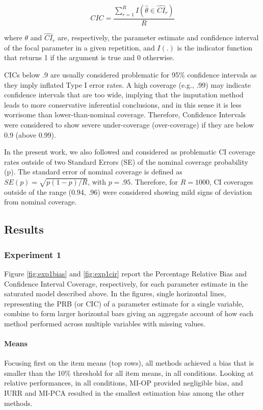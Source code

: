 	\begin{equation} \label{eqn:cic}
		CIC =  \frac{ \sum_{r=1}^{R} I(\hat{\theta} \in \widehat{CI}_r ) }{R}
	\end{equation}

	where $\theta$ and $\widehat{CI}_r$ are, respectively, the parameter estimate and confidence interval of
	the focal parameter in a given repetition, 
	and $I(.)$ is the indicator function that returns 1 if the argument is true and 0 otherwise.

	CICs below .9 are usually considered problematic for 95\% confidence intervals \cite[p. 52]{vanBuuren:2018} 
	as they imply inflated Type I error rates.
	A high coverage (e.g., .99) may indicate confidence intervals that are too wide, implying that
	the imputation method leads to more conservative inferential conclusions, and in this sense it is less worrisome 
	than lower-than-nominal coverage.
	Therefore, Confidence Intervals were considered to show severe under-coverage (over-coverage) if they are 
	below 0.9 (above 0.99).

	In the present work, we also followed \cite{burtonEtAl:2006} and considered as problematic CI coverage rates
	outside of two Standard Errors (SE) of the nominal coverage probability (p).
	The standard error of nominal coverage is defined as $SE(p) = \sqrt{p (1-p)/R}$, with $p = .95$.
	Therefore, for $R = 1000$, CI coverages outside of the range (0.94, .96) were considered showing mild
	signs of deviation from nominal coverage.

\subsection{Results}

\subsubsection{Experiment 1}

	Figure \ref{fig:exp1bias} and \ref{fig:exp1cir} report the Percentage Relative 
	Bias and Confidence Interval Coverage, respectively, for each parameter estimate in the saturated model described 
	above.
	In the figures, single horizontal lines, representing the PRB (or CIC) of a parameter estimate for a single variable, 
	combine to form larger horizontal bars giving an aggregate account of how each method performed across
	multiple variables with missing values.

	\paragraph{Means} 
	Focusing first on the item means (top rows), all methods achieved a bias that is smaller than the 10\% threshold 
	for all item means, in all conditions.
	Looking at relative performances, in all conditions, MI-OP provided negligible bias, and IURR and MI-PCA resulted 
	in the smallest estimation bias among the other methods.

